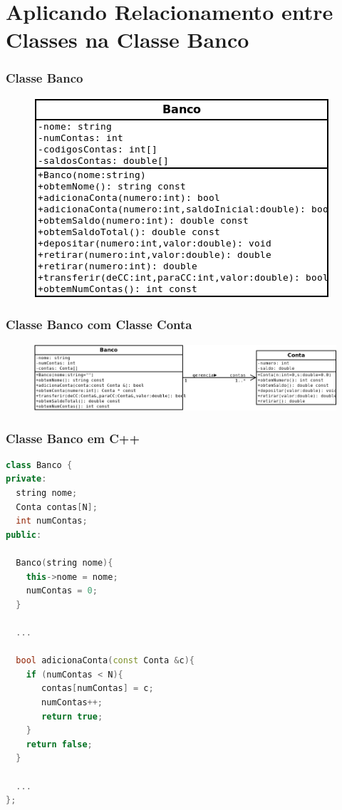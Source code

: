 \documentclass[aspectratio=169]{beamer}
\begin{document}
\section{Aplicando Relacionamento entre Classes na Classe Banco}

\begin{frame}\frametitle{Classe Banco}
\begin{figure}[h]
	\includegraphics[height=0.6\paperheight]{imagens/banco1.png}
\end{figure}
\end{frame}

\begin{frame}\frametitle{Classe Banco com Classe Conta}
\begin{figure}[h]
	\includegraphics[height=0.35\paperheight]{imagens/banco2.png}
\end{figure}
\end{frame}

\begin{frame}[fragile]\frametitle{Classe Banco em C++}
\begin{lstlisting}[language=C++,basicstyle=\ttfamily\tiny]
class Banco {
private:
  string nome;
  Conta contas[N];
  int numContas;
public:

  Banco(string nome){
    this->nome = nome;
    numContas = 0;
  }

  ...

  bool adicionaConta(const Conta &c){
    if (numContas < N){
       contas[numContas] = c;
       numContas++;
       return true;
    }
    return false;
  }

  ...
};
\end{lstlisting}
\end{frame}
\end{document}
